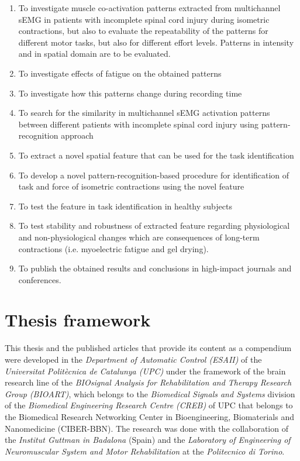 \begin{enumerate}[I]

\item To investigate muscle co-activation patterns extracted from multichannel sEMG in patients with incomplete spinal cord injury during isometric contractions, but also to evaluate the repeatability of the patterns for different motor tasks, but also for different effort levels. Patterns in intensity and in spatial domain are to be evaluated.

\item To investigate effects of fatigue on the obtained patterns

\item To investigate how this patterns change during recording time

\item To search for the similarity in multichannel sEMG activation patterns between different patients with incomplete spinal cord injury using pattern-recognition approach

\item To extract a novel spatial feature that can be used for the task identification

\item To develop a novel pattern-recognition-based procedure for identification of task and force of isometric contractions using the novel feature

\item To test the feature in task identification in healthy subjects

\item To test stability and robustness of extracted feature regarding physiological and non-physiological changes which are consequences of long-term contractions (i.e. myoelectric fatigue and gel drying).

\item To publish the obtained results and conclusions in high-impact journals and conferences.

\end{enumerate}

     \section{Thesis framework}
     
This thesis and the published articles that provide its content as a compendium were developed in the \emph{Department of Automatic Control (ESAII)} of the \emph{Universitat Polit\`{e}cnica de Catalunya (UPC)} under the framework of the brain research line of the \emph{BIOsignal Analysis for Rehabilitation and Therapy Research Group (BIOART)}, which belongs to the \emph{Biomedical Signals and Systems} division of the \emph{Biomedical Engineering Research Centre (CREB)} of UPC that belongs to the Biomedical Research Networking Center in Bioengineering, Biomaterials and Nanomedicine (CIBER-BBN). The research was done with the collaboration of the \emph{Institut Guttman in Badalona} (Spain) and the \emph{Laboratory of Engineering of Neuromuscular System and Motor Rehabilitation} at the \emph{Politecnico di Torino}.

